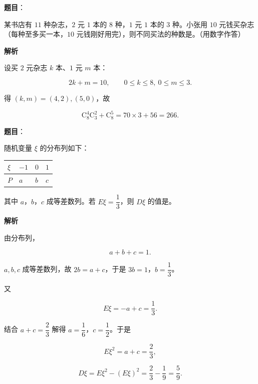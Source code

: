 \begin{answer}

\textbf{题目}：

某书店有 $11$ 种杂志，$2$ 元 $1$ 本的 $8$ 种，$1$ 元 $1$ 本的 $3$ 种。小张用 $10$ 元钱买杂志（每种至多买一本，$10$ 元钱刚好用完），则不同买法的种数是\gkblank{}。（用数字作答）

\textbf{解析}

设买 $2$ 元杂志 $k$ 本、$1$ 元 $m$ 本：

\nopagebreak[4]
\[2k+m=10,\qquad 0\leqslant k\leqslant8,\ 0\leqslant m\leqslant3.\]

得 $(k,m)=(4,2),(5,0)$，故

\nopagebreak[4]
\[\mathrm C_8^4\mathrm C_3^2+\mathrm C_8^5=70\times3+56=266.\]


\end{answer}
\begin{answer}

\textbf{题目}：

随机变量 $\xi$ 的分布列如下：

\begin{center}
\begin{tabular}{llll}
\toprule
$\xi$ & $-1$ & $0$ & $1$ \\
\midrule
$P$ & $a$ & $b$ & $c$ \\
\bottomrule
\end{tabular}
\end{center}

其中 $a$，$b$，$c$ 成等差数列。若 $E\xi=\dfrac13$，则 $D\xi$ 的值是\gkblank{}。

\textbf{解析}

由分布列，

\nopagebreak[4]
\[a+b+c=1.\]

$a,b,c$ 成等差数列，故 $2b=a+c$，于是 $3b=1$，$b=\dfrac13$。

又

\nopagebreak[4]
\[E\xi=-a+c=\frac13.\]

结合 $a+c=\dfrac23$ 解得 $a=\dfrac16$，$c=\dfrac12$。于是

\nopagebreak[4]
\[E\xi^2=a+c=\frac23,\]

\nopagebreak[4]
\[D\xi=E\xi^2-(E\xi)^2=\frac23-\frac19=\frac59.\]


\end{answer}
